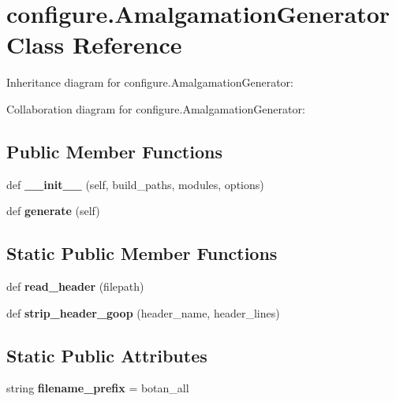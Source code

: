 \hypertarget{classconfigure_1_1_amalgamation_generator}{}\section{configure.\+Amalgamation\+Generator Class Reference}
\label{classconfigure_1_1_amalgamation_generator}


Inheritance diagram for configure.\+Amalgamation\+Generator\+:


Collaboration diagram for configure.\+Amalgamation\+Generator\+:
\subsection*{Public Member Functions}
\begin{DoxyCompactItemize}
\item 
\mbox{\label{classconfigure_1_1_amalgamation_generator_a287f936f12bb081418f6d043499d6801}} 
def {\bfseries \+\_\+\+\_\+init\+\_\+\+\_\+} (self, build\+\_\+paths, modules, options)
\item 
\mbox{\label{classconfigure_1_1_amalgamation_generator_a0e364754ace1a926789ae589b54a955f}} 
def {\bfseries generate} (self)
\end{DoxyCompactItemize}
\subsection*{Static Public Member Functions}
\begin{DoxyCompactItemize}
\item 
\mbox{\label{classconfigure_1_1_amalgamation_generator_a4942b24d2ddeab82b67862b04f47e54f}} 
def {\bfseries read\+\_\+header} (filepath)
\item 
\mbox{\label{classconfigure_1_1_amalgamation_generator_a7f63b766991e0d5717a3fec5b6534236}} 
def {\bfseries strip\+\_\+header\+\_\+goop} (header\+\_\+name, header\+\_\+lines)
\end{DoxyCompactItemize}
\subsection*{Static Public Attributes}
\begin{DoxyCompactItemize}
\item 
\mbox{\label{classconfigure_1_1_amalgamation_generator_a184f002f9ca14ae5f78f03708bc1a50a}} 
string {\bfseries filename\+\_\+prefix} = \textquotesingle{}botan\+\_\+all\textquotesingle{}
\end{DoxyCompactItemize}


